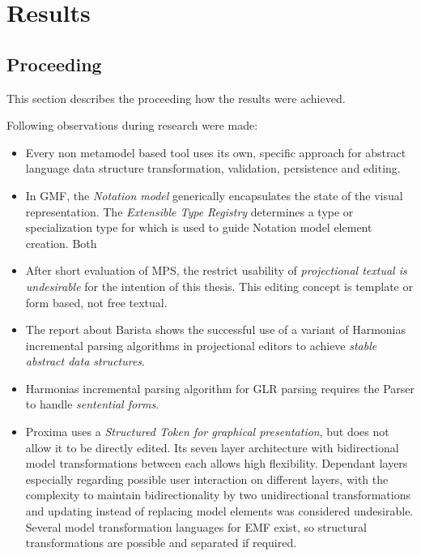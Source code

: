 \chapter{Results}


\section{Proceeding} 
This section describes the proceeding how the results were achieved.

Following observations during research were made:
\begin{itemize}
	\item Every non metamodel based tool uses its own, specific approach for abstract language data structure transformation, validation, persistence and editing.
	\item In GMF, the \emph{Notation model} generically encapsulates the state of the visual representation. The \emph{Extensible Type Registry} determines a type or specialization type for which is used to guide Notation model element creation. Both 
	\item After short evaluation of MPS, the restrict usability of \emph{projectional textual is undesirable} for the intention of this thesis. This editing concept is template or form based, not free textual.
	\item The report \cite{Barista} about Barista shows the successful use of a variant of Harmonias incremental parsing algorithms in projectional editors to achieve \emph{stable abstract data structures}.
	\item Harmonias incremental parsing algorithm for GLR parsing requires the Parser to handle \emph{sentential forms}.
	\item Proxima uses a \emph{Structured Token for graphical presentation}, but does not allow it to be directly edited.  Its seven layer architecture with bidirectional model transformations between each allows high flexibility. Dependant layers especially regarding possible user interaction on different layers, with the complexity to maintain bidirectionality by two unidirectional transformations and updating instead of replacing model elements was considered undesirable. Several model transformation languages for EMF exist, so structural transformations are possible and separated if required. 
\end{itemize}

